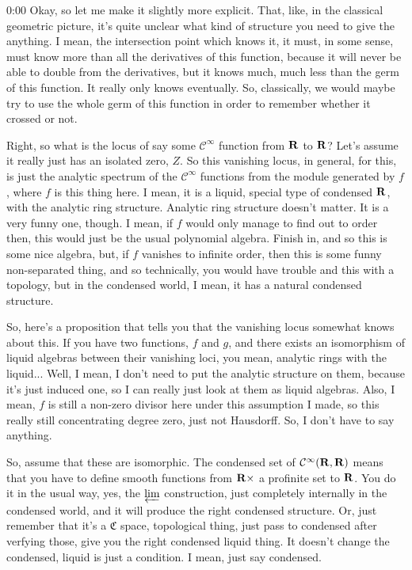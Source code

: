 \begin{unfinished}{0:00}
Okay, so let me make it slightly more explicit. That, like, in the classical geometric picture, it's quite unclear what kind of structure you need to give the anything. I mean, the intersection point which knows it, it must, in some sense, must know more than all the derivatives of this function, because it will never be able to double from the derivatives, but it knows much, much less than the germ of this function. It really only knows eventually. So, classically, we would maybe try to use the whole germ of this function in order to remember whether it crossed or not.

Right, so what is the locus of say some $\mathcal{C}^\infty$ function from $\mathbf R$ to $\mathbf R$? Let's assume it really just has an isolated zero, $Z$. So this vanishing locus, in general, for this, is just the analytic spectrum of the $\mathcal{C}^\infty$ functions from the module generated by $f$, where $f$ is this thing here. I mean, it is a liquid, special type of condensed $\mathbf R$, with the analytic ring structure. Analytic ring structure doesn't matter. It is a very funny one, though. I mean, if $f$ would only manage to find out to order then, this would just be the usual polynomial algebra. Finish in, and so this is some nice algebra, but, if $f$ vanishes to infinite order, then this is some funny non-separated thing, and so technically, you would have trouble and this with a topology, but in the condensed world, I mean, it has a natural condensed structure.

So, here's a proposition that tells you that the vanishing locus somewhat knows about this. If you have two functions, $f$ and $g$, and there exists an isomorphism of liquid algebras between their vanishing loci, you mean, analytic rings with the liquid... Well, I mean, I don't need to put the analytic structure on them, because it's just induced one, so I can really just look at them as liquid algebras. Also, I mean, $f$ is still a non-zero divisor here under this assumption I made, so this really still concentrating degree zero, just not Hausdorff. So, I don't have to say anything.

So, assume that these are isomorphic. The condensed set of $\mathcal{C}^\infty(\mathbf R, \mathbf R)$ means that you have to define smooth functions from $\mathbf R \times$ a profinite set to $\mathbf R$. You do it in the usual way, yes, the $\varprojlim$ construction, just completely internally in the condensed world, and it will produce the right condensed structure. Or, just remember that it's a $\mathfrak{C}$ space, topological thing, just pass to condensed after verfying those, give you the right condensed liquid thing. It doesn't change the condensed, liquid is just a condition. I mean, just say condensed.


\end{unfinished}
